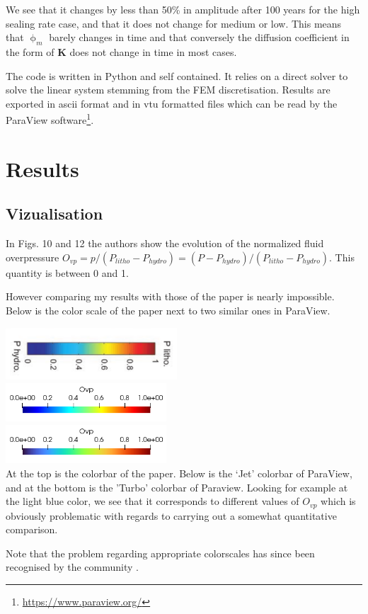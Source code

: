We see that it changes by less than 50\% in amplitude after 100 years for the 
high sealing rate case, and that it does not change for medium or low.  
This means that $\upphi_m$ barely changes in time and that 
conversely the diffusion coefficient in the form of ${\bm K}$ does not
change in time in most cases. 

The code is written in Python and self contained. It relies on a direct solver
to solve the linear system stemming from the FEM discretisation.
Results are exported in ascii format and in vtu formatted files which can be read by the 
ParaView software\footnote{\url{https://www.paraview.org/}}.


\newpage

\section*{Results}

\subsection*{Vizualisation}

In Figs. 10 and 12 the authors show the evolution of the
normalized fluid overpressure $O_{vp} = p/(P_{litho}-P_{hydro})= 
(P- P_{hydro})/(P_{litho} - P_{hydro})$. This quantity is between 0 and 1.

However comparing my results with those of the paper is nearly impossible. Below is the
color scale of the paper next to two similar ones in ParaView. 
\begin{center}
\includegraphics[width=6.4cm]{python_codes/fieldstone_126/images/grfr03_Ovp}\\
\includegraphics[width=6cm]{python_codes/fieldstone_126/images/jet}\\
\includegraphics[width=6cm]{python_codes/fieldstone_126/images/turbo}\\
{\captionfont At the top is the colorbar of the paper.
Below is the `Jet' colorbar of ParaView, and at the bottom is 
the 'Turbo' colorbar of Paraview. Looking for example at the light blue color, we see that 
it corresponds to different values of $O_{vp}$ which is obviously
problematic with regards to carrying out a somewhat quantitative comparison.}
\end{center}
Note that the problem regarding appropriate colorscales has since been 
recognised by the community \cite{crsh20}.

